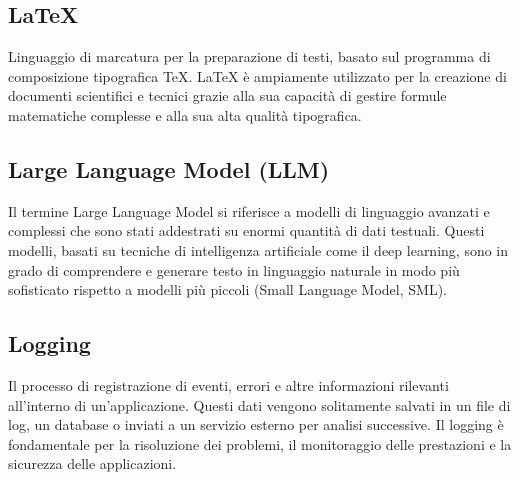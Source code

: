 \subsection*{\LaTeX}
Linguaggio di marcatura per la preparazione di testi, basato sul programma di composizione tipografica TeX. LaTeX è ampiamente utilizzato per la creazione 
di documenti scientifici e tecnici grazie alla sua capacità di gestire formule matematiche complesse e alla sua alta qualità tipografica.

\hypertarget{sec:LLM}{}
\subsection*{Large Language Model (LLM)}
Il termine Large Language Model si riferisce a modelli di linguaggio avanzati e complessi che sono stati addestrati su enormi quantità di dati testuali. 
Questi modelli, basati su tecniche di intelligenza artificiale come il deep learning, sono in grado di comprendere e generare testo in linguaggio naturale 
in modo più sofisticato rispetto a modelli più piccoli (Small Language Model, SML).

\hypertarget{sec:logging}{}
\subsection*{Logging}
Il processo di registrazione di eventi, errori e altre informazioni rilevanti all'interno di un'applicazione. Questi dati vengono 
solitamente salvati in un file di log, un database o inviati a un servizio esterno per analisi successive. Il logging è fondamentale 
per la risoluzione dei problemi, il monitoraggio delle prestazioni e la sicurezza delle applicazioni.

\newpage
